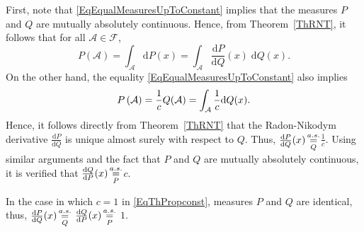 \documentclass[lettersize,onecolumn]{IEEEtran}
\begin{document}
\begin{IEEEproof}
First, note that \eqref{EqEqualMeasuresUpToConstant} implies that the measures $P$ and $Q$ are mutually absolutely 
continuous. Hence, from Theorem~\ref{ThRNT}, it follows that for all $\mathcal{A} \in \mathscr{F}$, 
\begin{equation}
P\left( \mathcal{A} \right) = \int_{\mathcal{A}} \mathrm{d} P(x) = \int_{\mathcal{A}}   \frac{\mathrm{d}P}{\mathrm{d}Q}(x) \; 
\mathrm{d}Q(x).
\end{equation}
On the other hand, the equality \eqref{EqEqualMeasuresUpToConstant} also  implies 
\begin{equation}
P\left( \mathcal{A} \right) = \frac{1}{c} Q(\mathcal A) =  \int_{\mathcal{A}} \frac{1}{c}  \mathrm{d} Q(x).
\end{equation}
Hence, it follows directly from Theorem~\ref{ThRNT} that the Radon-Nikodym derivative $ \frac{\mathrm{d} P}
{\mathrm{d} Q}$ is unique almost surely with respect to $Q$. Thus,
 $\frac{\mathrm{d}P}{\mathrm{d}Q}(x) \displaystyle\mathop{ \stackrel{a.s.}{=}}_{Q} $$\frac{1}{c}$.
Using similar arguments and the fact that $P$ and $Q$ are mutually absolutely continuous, it is verified that
 $\frac{\mathrm{d}Q}{\mathrm{d}P}(x) \displaystyle\mathop{ \stackrel{a.s.}{=}}_{P}$$ c$.
\end{IEEEproof}
 In the case in which $c=1$ in \eqref{EqThPropconst}, measures $P$ and $Q$ are identical, thus, $ \frac{\mathrm{d} P}{\mathrm{d} 
 Q}(x) \displaystyle\mathop{ \stackrel{a.s.}{=}}_{Q}$ $ \frac{\mathrm{d} Q}{\mathrm{d} P}(x) \displaystyle\mathop{ \stackrel{a.s.}{=}}_{P} $ $1.$
 
\end{document}
